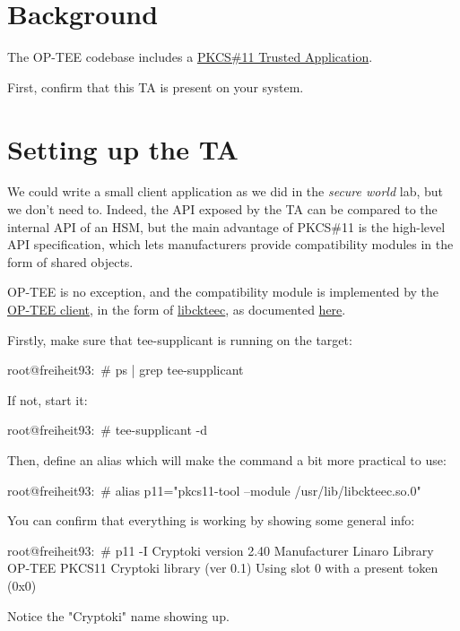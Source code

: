 
\section{Background}

The OP-TEE codebase includes a
\href{https://github.com/OP-TEE/optee_os/tree/master/ta/pkcs11}{PKCS\#11 Trusted Application}.

First, confirm that this TA is present on your system.

\section{Setting up the TA}

We could write a small client application as we did in the \textit{secure world} lab, but
we don't need to.
Indeed, the API exposed by the TA can be compared to the internal API of an HSM, but the main
advantage of PKCS\#11 is the high-level API specification, which lets manufacturers provide
compatibility modules in the form of shared objects.

OP-TEE is no exception, and the compatibility module is implemented by the
\href{https://optee.readthedocs.io/en/latest/building/gits/optee_client.html}{OP-TEE client},
in the form of \href{https://github.com/OP-TEE/optee_client/tree/master/libckteec}{libckteec},
as documented \href{https://optee.readthedocs.io/en/latest/building/userland_integration.html#pkcs-11-driver}{here}.

Firstly, make sure that tee-supplicant is running on the target:

\begin{bashinput}
root@freiheit93:~# ps | grep tee-supplicant
\end{bashinput}

If not, start it:

\begin{bashinput}
root@freiheit93:~# tee-supplicant -d
\end{bashinput}

Then, define an alias which will make the  command a bit more
practical to use:

\begin{bashinput}
root@freiheit93:~# alias p11="pkcs11-tool --module /usr/lib/libckteec.so.0"
\end{bashinput}

You can confirm that everything is working by showing some general info:
\begin{bashinput}
root@freiheit93:~# p11 -I
Cryptoki version 2.40
Manufacturer     Linaro
Library          OP-TEE PKCS11 Cryptoki library (ver 0.1)
Using slot 0 with a present token (0x0)
\end{bashinput}
Notice the "Cryptoki" name showing up.

